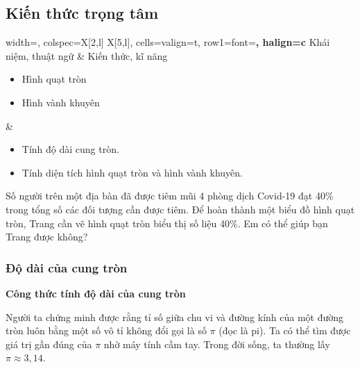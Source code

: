 \begin{lesson}
    \subsection{Kiến thức trọng tâm}

    \begin{center}
    \begin{tblr}{
        width=\linewidth,
        colspec={X[2,l] X[5,l]},
        cells={valign=t},
        row{1}={font=\bfseries, halign=c}
    }
        Khái niệm, thuật ngữ & Kiến thức, kĩ năng \\
        \begin{minipage}[t]{\linewidth}
        \begin{itemize}
            \item Hình quạt tròn
            \item Hình vành khuyên
        \end{itemize}
        \end{minipage}
        &
        \begin{minipage}[t]{\linewidth}
        \begin{itemize}
            \item Tính độ dài cung tròn.
            \item Tính diện tích hình quạt tròn và hình vành khuyên.
        \end{itemize}
        \end{minipage}
    \end{tblr}
    \end{center}

    Số người trên một địa bàn đã được tiêm mũi 4 phòng dịch Covid-19 đạt 40\% trong tổng số các đối tượng cần được tiêm. Để hoàn thành một biểu đồ hình quạt tròn, Trang cần vẽ hình quạt tròn biểu thị số liệu 40\%. Em có thể giúp bạn Trang được không?

    \subsubsection{Độ dài của cung tròn}

    \textbf{Công thức tính độ dài của cung tròn}

    Người ta chứng minh được rằng tỉ số giữa chu vi và đường kính của một đường tròn luôn bằng một số vô tỉ không đổi gọi là số $\pi$ (đọc là pi). Ta có thể tìm được giá trị gần đúng của $\pi$ nhờ máy tính cầm tay. Trong đời sống, ta thường lấy $\pi\approx3{,}14$.


\end{lesson}
